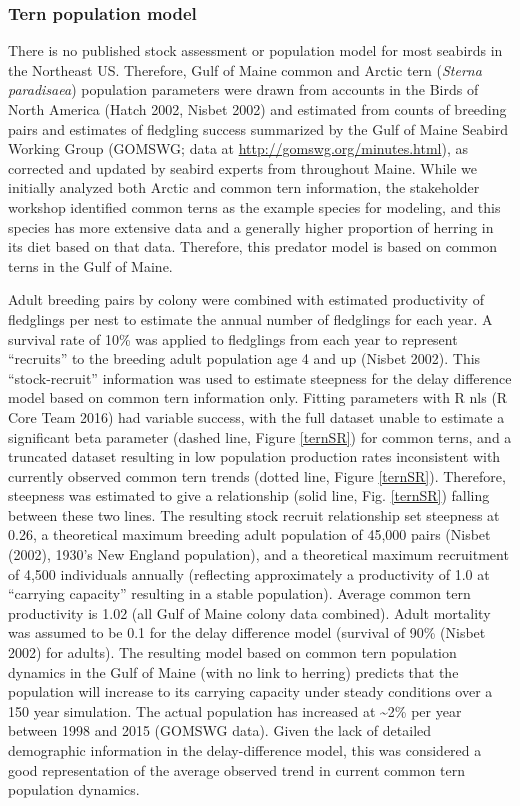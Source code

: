 \documentclass[]{article}
\begin{document}
\subsubsection{Tern population model}\label{tern-population-model}

There is no published stock assessment or population model for most
seabirds in the Northeast US. Therefore, Gulf of Maine common and Arctic
tern (\emph{Sterna paradisaea}) population parameters were drawn from
accounts in the Birds of North America (Hatch 2002, Nisbet 2002) and
estimated from counts of breeding pairs and estimates of fledgling
success summarized by the Gulf of Maine Seabird Working Group (GOMSWG;
data at \url{http://gomswg.org/minutes.html}), as corrected and updated
by seabird experts from throughout Maine. While we initially analyzed
both Arctic and common tern information, the stakeholder workshop
identified common terns as the example species for modeling, and this
species has more extensive data and a generally higher proportion of
herring in its diet based on that data. Therefore, this predator model
is based on common terns in the Gulf of Maine.

Adult breeding pairs by colony were combined with estimated productivity
of fledglings per nest to estimate the annual number of fledglings for
each year. A survival rate of 10\% was applied to fledglings from each
year to represent ``recruits'' to the breeding adult population age 4
and up (Nisbet 2002). This ``stock-recruit'' information was used to
estimate steepness for the delay difference model based on common tern
information only. Fitting parameters with R nls (R Core Team 2016) had
variable success, with the full dataset unable to estimate a significant
beta parameter (dashed line, Figure \ref{ternSR}) for common terns, and
a truncated dataset resulting in low population production rates
inconsistent with currently observed common tern trends (dotted line,
Figure \ref{ternSR}). Therefore, steepness was estimated to give a
relationship (solid line, Fig. \ref{ternSR}) falling between these two
lines. The resulting stock recruit relationship set steepness at 0.26, a
theoretical maximum breeding adult population of 45,000 pairs (Nisbet
(2002), 1930's New England population), and a theoretical maximum
recruitment of 4,500 individuals annually (reflecting approximately a
productivity of 1.0 at ``carrying capacity'' resulting in a stable
population). Average common tern productivity is 1.02 (all Gulf of Maine
colony data combined). Adult mortality was assumed to be 0.1 for the
delay difference model (survival of 90\% (Nisbet 2002) for adults). The
resulting model based on common tern population dynamics in the Gulf of
Maine (with no link to herring) predicts that the population will
increase to its carrying capacity under steady conditions over a 150
year simulation. The actual population has increased at
\textasciitilde{}2\% per year between 1998 and 2015 (GOMSWG data). Given
the lack of detailed demographic information in the delay-difference
model, this was considered a good representation of the average observed
trend in current common tern population dynamics.
\end{document}
